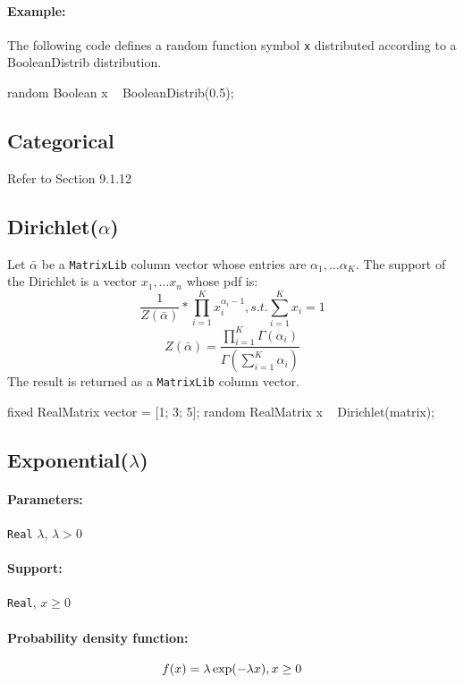 \paragraph*{Example:}
The following code defines a random function symbol \verb|x| distributed according to a BooleanDistrib distribution.
\begin{blogcode}
random Boolean x ~ BooleanDistrib(0.5);
\end{blogcode}

\subsection{Categorical}
Refer to Section 9.1.12

\subsection{Dirichlet($\alpha$)}
Let $\bar{\alpha}$ be a \texttt{MatrixLib} column vector whose entries are $\alpha_{1}, \ldots \alpha_{K}$. The support of the Dirichlet is a vector $x_{1}, \ldots x_{n}$ whose pdf is:
$$
	\frac{1}{Z(\bar{\alpha})} * \prod_{i=1}^{K} x_{i}^{\alpha_{i} - 1}
	, s.t. \sum_{i=1}^{K} x_{i} = 1
$$  
$$ Z(\bar{\alpha}) = \frac{ \prod_{i=1}^{K} \Gamma(\alpha_{i})   }{ \Gamma(\sum_{i=1}^{K} \alpha_{i} )  } $$
The result is returned as a \texttt{MatrixLib} column vector.

\begin{blogcode}
fixed RealMatrix vector = [1; 3; 5];
random RealMatrix x ~ Dirichlet(matrix);
\end{blogcode}

\subsection{Exponential($\lambda$)} 

\paragraph*{Parameters:} 
\begin{itemize*}
\item[] \verb|Real|
 $\lambda$, $\lambda > 0$ 
\end{itemize*}
\paragraph*{Support:} \verb|Real|, $x \geq 0$ 

\paragraph*{Probability density function:}
\[
	f(x) = \lambda \exp(-\lambda x) , x \geq 0 \\
\]


